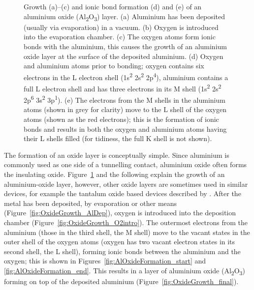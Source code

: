 \begin{figure}[t]
\begin{center}
\caption[Growth and chemical fabrication of a metal-oxide layer]{Growth (a)--(c) and ionic bond formation (d) and (e) of an aluminium oxide (Al\textsubscript{2}O\textsubscript{3}) layer. (a) Aluminium has been deposited (usually via evaporation) in a vacuum. (b) Oxygen is introduced into the evaporation chamber. (c) The oxygen atoms form ionic bonds with the aluminium, this causes the growth of an aluminium oxide layer at the surface of the deposited aluminium. (d) Oxygen and aluminium atoms prior to bonding; oxygen contains six electrons in the L electron shell (1s\textsuperscript{2} 2s\textsuperscript{2} 2p\textsuperscript{4}), aluminium contains a full L electron shell and has three electrons in its M shell (1s\textsuperscript{2} 2s\textsuperscript{2} 2p\textsuperscript{6} 3s\textsuperscript{2} 3p\textsuperscript{1}). (e) The electrons from the M shells in the aluminium atoms (shown in grey for clarity) move to the L shell  of the oxygen atoms (shown as the red electrons); this is the formation of ionic bonds and results in both the oxygen and aluminium atoms having their L shells filled (for tidiness, the full K shell is not shown).}\label{fig:AluminiumOxideGrowth}
\end{center}
\end{figure}
\par 
The formation of an oxide layer is conceptually simple. Since aluminium is commonly used \parencite[for example those described by][]{Clark2005, Pekola2004, Prest2011} as one side of a tunnelling contact, aluminium oxide often forms the insulating oxide. Figure~\ref{fig:AluminiumOxideGrowth} and the following explain the growth of an aluminium-oxide layer, however, other oxide layers are sometimes used in similar devices, for example the tantalum oxide based devices described by \textcite{Chaudhuri2014}. After the metal has been deposited, by evaporation or other means (Figure~\ref{fig:OxideGrowth_AlDep}), oxygen is introduced into the deposition chamber (Figure~\ref{fig:OxideGrowth_O2intro}). The outermost electrons from the aluminium (those in the third shell, the M shell) move to the vacant states in the outer shell of the oxygen atoms (oxygen has two vacant electron states in its second shell, the L shell), forming ionic bonds between the aluminium and the oxygen; this is shown in Figures~\ref{fig:AlOxideFormation_start} and \ref{fig:AlOxideFormation_end}. This results in a layer of aluminium oxide (Al\textsubscript{2}O\textsubscript{3}) forming on top of the deposited aluminium (Figure~\ref{fig:OxideGrowth_final}).
\par 
